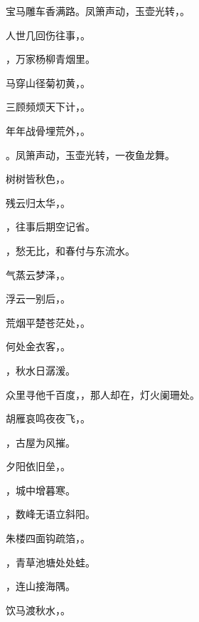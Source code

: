 \documentclass[12pt, a4paper, addpoints]{exam}
\begin{document}
\begin{questions}
\question[1] 宝马雕车香满路。凤箫声动，玉壶光转，\uline{\qquad\qquad\qquad}。

\question[1] 人世几回伤往事，\uline{\qquad\qquad\qquad}。

\question[1] \uline{\qquad\qquad\qquad}，万家杨柳青烟里。

\question[1] 马穿山径菊初黄，\uline{\qquad\qquad\qquad}。

\question[1] 三顾频烦天下计，\uline{\qquad\qquad\qquad}。

\question[1] 年年战骨埋荒外，\uline{\qquad\qquad\qquad}。

\question[1] \uline{\qquad\qquad\qquad}。凤箫声动，玉壶光转，一夜鱼龙舞。

\question[1] 树树皆秋色，\uline{\qquad\qquad\qquad}。

\question[1] 残云归太华，\uline{\qquad\qquad\qquad}。

\question[1] \uline{\qquad\qquad\qquad}，往事后期空记省。

\question[1] \uline{\qquad\qquad\qquad}，愁无比，和春付与东流水。

\question[1] 气蒸云梦泽，\uline{\qquad\qquad\qquad}。

\question[1] 浮云一别后，\uline{\qquad\qquad\qquad}。

\question[1] 荒烟平楚苍茫处，\uline{\qquad\qquad\qquad}。

\question[1] 何处金衣客，\uline{\qquad\qquad\qquad}。

\question[1] \uline{\qquad\qquad\qquad}，秋水日潺湲。

\question[1] 众里寻他千百度，\uline{\qquad\qquad\qquad}，那人却在，灯火阑珊处。

\question[1] 胡雁哀鸣夜夜飞，\uline{\qquad\qquad\qquad}。

\question[1] \uline{\qquad\qquad\qquad}，古屋为风摧。

\question[1] 夕阳依旧垒，\uline{\qquad\qquad\qquad}。

\question[1] \uline{\qquad\qquad\qquad}，城中增暮寒。

\question[1] \uline{\qquad\qquad\qquad}，数峰无语立斜阳。

\question[1] 朱楼四面钩疏箔，\uline{\qquad\qquad\qquad}。

\question[1] \uline{\qquad\qquad\qquad}，青草池塘处处蛙。

\question[1] \uline{\qquad\qquad\qquad}，连山接海隅。

\question[1] 饮马渡秋水，\uline{\qquad\qquad\qquad}。


\end{questions}
\end{document}
